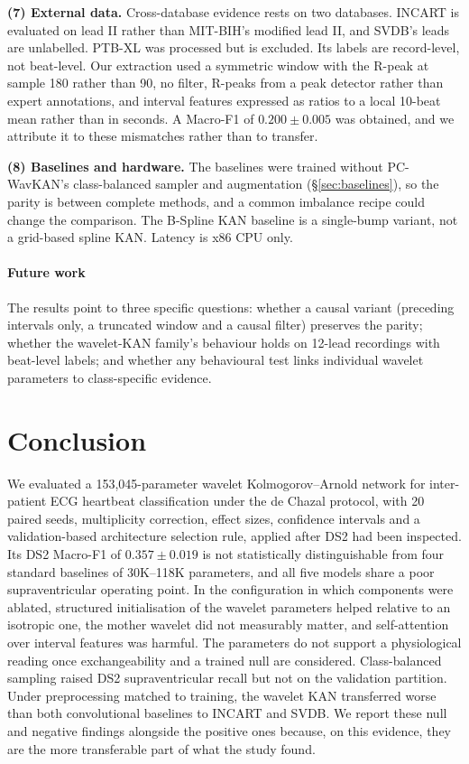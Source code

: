 \documentclass[preprint,12pt]{elsarticle}
\begin{document}
\noindent\textbf{(7) External data.} Cross-database evidence rests on two databases. INCART is evaluated on lead II rather than MIT-BIH's modified lead II, and SVDB's leads are unlabelled. PTB-XL \cite{wagner_ptb-xl_2020} was processed but is excluded. Its labels are record-level, not beat-level. Our extraction used a symmetric window with the R-peak at sample 180 rather than 90, no filter, R-peaks from a peak detector rather than expert annotations, and interval features expressed as ratios to a local 10-beat mean rather than in seconds. A Macro-F1 of $0.200\pm0.005$ was obtained, and we attribute it to these mismatches rather than to transfer.

\noindent\textbf{(8) Baselines and hardware.} The baselines were trained without PC-WavKAN's class-balanced sampler and augmentation (\S\ref{sec:baselines}), so the parity is between complete methods, and a common imbalance recipe could change the comparison. The B-Spline KAN baseline is a single-bump variant, not a grid-based spline KAN. Latency is x86 CPU only.

\paragraph{Future work} The results point to three specific questions: whether a causal variant (preceding intervals only, a truncated window and a causal filter) preserves the parity; whether the wavelet-KAN family's behaviour holds on 12-lead recordings with beat-level labels; and whether any behavioural test links individual wavelet parameters to class-specific evidence.

\section{Conclusion}
\label{sec:conclusion}
We evaluated a 153,045-parameter wavelet Kolmogorov--Arnold network for inter-patient ECG heartbeat classification under the de Chazal protocol, with 20 paired seeds, multiplicity correction, effect sizes, confidence intervals and a validation-based architecture selection rule, applied after DS2 had been inspected. Its DS2 Macro-F1 of $0.357\pm0.019$ is not statistically distinguishable from four standard baselines of 30K--118K parameters, and all five models share a poor supraventricular operating point. In the configuration in which components were ablated, structured initialisation of the wavelet parameters helped relative to an isotropic one, the mother wavelet did not measurably matter, and self-attention over interval features was harmful. The parameters do not support a physiological reading once exchangeability and a trained null are considered. Class-balanced sampling raised DS2 supraventricular recall but not on the validation partition. Under preprocessing matched to training, the wavelet KAN transferred worse than both convolutional baselines to INCART and SVDB. We report these null and negative findings alongside the positive ones because, on this evidence, they are the more transferable part of what the study found.
\end{document}
